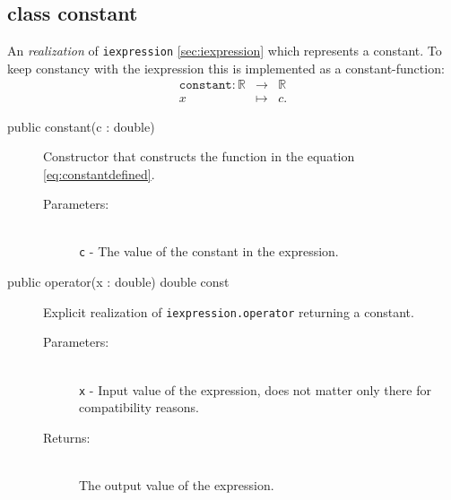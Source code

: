 \documentclass[a4paper,11pt]{kth-mag}
\newcommand{\RR}{\ensuremath{\mathbb{R}}}
\begin{document}
\subsection{class constant} An \emph{realization} of \texttt{iexpression}
\ref{sec:iexpression} which represents a constant. To keep constancy with the
iexpression this is implemented as a constant-function:
\begin{eqnarray}
    \label{eq:constantdefined}
    \texttt{constant}: \RR &\rightarrow& \RR \nonumber \\
    x &\mapsto& c .
\end{eqnarray}
\begin{description}
    \item[public constant(c : double)] Constructor 
    that constructs the function in the equation \ref{eq:constantdefined}. 
    \begin{description}
        \item[Parameters:]~\\
            \verb+c+ - The value of the constant in the expression.
    \end{description}
\end{description}
\begin{description}
    \item[public operator(x : double) double const] 
    Explicit realization of \texttt{iexpression.operator} returning a
    constant.
    \begin{description}
        \item[Parameters:]~\\
            \verb+x+ - Input value of the expression, does not matter only
            there for compatibility reasons. 
        \item[Returns:]~\\
            The output value of the expression.
    \end{description}
\end{description}
\end{document}
